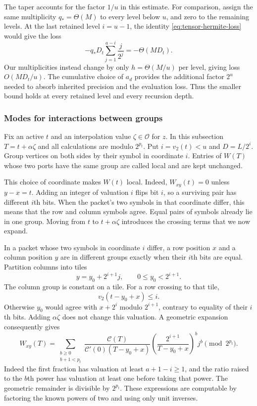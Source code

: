 The taper accounts for the factor $1/u$ in this estimate.
For comparison, assign the same multiplicity $q_*=\Theta(M)$ to
every level below $u$, and zero to the remaining levels.  At the
last retained level $i=u-1$, the identity
\eqref{eq:tensor-hermite-loss} would give the loss
\[
 -q_*D_t\sum_{j=1}^{a-i}\frac{j}{2^j}=-\Theta(MD_t).
\]
Our multiplicities instead change by only $h=\Theta(M/u)$ per
level, giving loss $O(MD_t/u)$.  The cumulative choice of $a_d$
provides the additional factor $2^u$ needed to absorb inherited
precision and the evaluation loss.  Thus the smaller bound holds
at every retained level and every recursion depth.

\subsubsection{Modes for interactions between groups}
\label{subsec:tensor-modes}

Fix an active $t$ and an interpolation value $\zeta\in\mathcal O$
for $z$.  In this subsection $T=t+\alpha\zeta$ and all calculations
are modulo $2^{p_t}$.  Put $i=v_2(t)<u$ and $D=L/2^i$.
Group vertices on both sides by their symbol in coordinate $i$.
Entries of $W(T)$ whose two ports have the same group are called
local and are kept unchanged.

This choice of coordinate makes $W(t)$ local.  Indeed,
$W_{xy}(t)=0$ unless $y-x=t$.  Adding an integer of valuation $i$
flips bit $i$, so a surviving pair has different $i$th bits.
When the packet's two symbols in that coordinate differ, this
means that the row and column symbols agree. Equal pairs of symbols
already lie in one group.  Moving from $t$ to $t+\alpha\zeta$ introduces
the crossing terms that we now expand.

In a packet whose two symbols in coordinate $i$ differ, a row
position $x$ and a column position $y$ are in different groups
exactly when their $i$th bits are equal.  Partition columns into
tiles
\[
 y=y_0+2^{i+1}j,\qquad 0\le y_0<2^{i+1}.
\]
The column group is constant on a tile.  For a row crossing to
that tile,
\[
 v_2(t-y_0+x)\le i.
\]
Otherwise $y_0$ would agree with $x+2^i$ modulo $2^{i+1}$,
contrary to equality of their $i$th bits.  Adding $\alpha\zeta$
does not change this valuation.  A geometric expansion consequently
gives
\begin{equation}\label{eq:tensor-mode-expansion}
 W_{xy}(T)=
 \sum_{\substack{b\ge0\\b+1<p_t}}
 \frac{\mathcal C(T)}
      {\mathcal C'(0)(T-y_0+x)}
 \left(\frac{2^{i+1}}{T-y_0+x}\right)^b j^b
 \pmod {2^{p_t}}.
\end{equation}
Indeed the first fraction has valuation at least $a+1-i\ge1$,
and the ratio raised to the $b$th power has valuation at least
one before taking that power.  The geometric remainder is
divisible by $2^{p_t}$.  These expressions are computable by
factoring the known powers of two and using only unit inverses.

